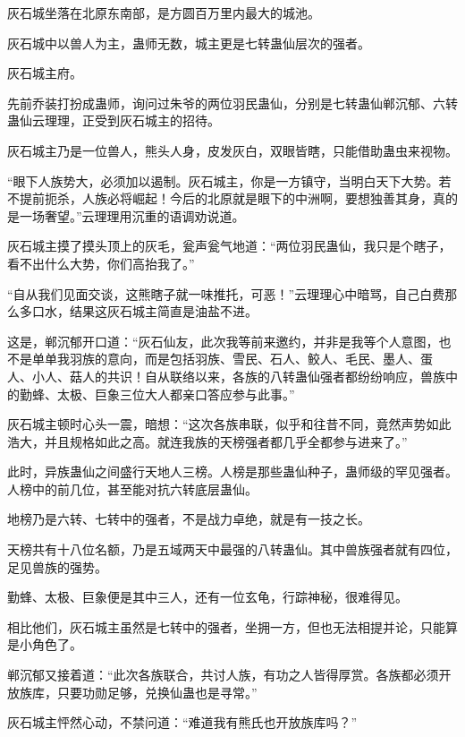 
\begin{this_body}



灰石城坐落在北原东南部，是方圆百万里内最大的城池。

灰石城中以兽人为主，蛊师无数，城主更是七转蛊仙层次的强者。

灰石城主府。

先前乔装打扮成蛊师，询问过朱爷的两位羽民蛊仙，分别是七转蛊仙郸沉郁、六转蛊仙云理理，正受到灰石城主的招待。

灰石城主乃是一位兽人，熊头人身，皮发灰白，双眼皆瞎，只能借助蛊虫来视物。

“眼下人族势大，必须加以遏制。灰石城主，你是一方镇守，当明白天下大势。若不提前扼杀，人族必将崛起！今后的北原就是眼下的中洲啊，要想独善其身，真的是一场奢望。”云理理用沉重的语调劝说道。

灰石城主摸了摸头顶上的灰毛，瓮声瓮气地道：“两位羽民蛊仙，我只是个瞎子，看不出什么大势，你们高抬我了。”

“自从我们见面交谈，这熊瞎子就一味推托，可恶！”云理理心中暗骂，自己白费那么多口水，结果这灰石城主简直是油盐不进。

这是，郸沉郁开口道：“灰石仙友，此次我等前来邀约，并非是我等个人意图，也不是单单我羽族的意向，而是包括羽族、雪民、石人、鲛人、毛民、墨人、蛋 人、小人、菇人的共识！自从联络以来，各族的八转蛊仙强者都纷纷响应，兽族中的勤蜂、太极、巨象三位大人都亲口答应参与此事。”

灰石城主顿时心头一震，暗想：“这次各族串联，似乎和往昔不同，竟然声势如此浩大，并且规格如此之高。就连我族的天榜强者都几乎全都参与进来了。”

此时，异族蛊仙之间盛行天地人三榜。人榜是那些蛊仙种子，蛊师级的罕见强者。人榜中的前几位，甚至能对抗六转底层蛊仙。

地榜乃是六转、七转中的强者，不是战力卓绝，就是有一技之长。

天榜共有十八位名额，乃是五域两天中最强的八转蛊仙。其中兽族强者就有四位，足见兽族的强势。

勤蜂、太极、巨象便是其中三人，还有一位玄龟，行踪神秘，很难得见。

相比他们，灰石城主虽然是七转中的强者，坐拥一方，但也无法相提并论，只能算是小角色了。

郸沉郁又接着道：“此次各族联合，共讨人族，有功之人皆得厚赏。各族都必须开放族库，只要功勋足够，兑换仙蛊也是寻常。”

灰石城主怦然心动，不禁问道：“难道我有熊氏也开放族库吗？”


\end{this_body}
